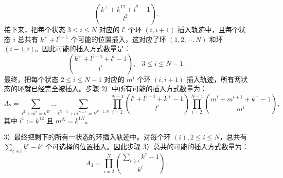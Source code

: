 \begin{equation*}
    \binom{k^++k^{12}+l^{2}-1}{l^{2}}.
\end{equation*}
接下来，把每个状态 $3 \leqslant i \leqslant N$ 对应的 $l^i$ 个环 $(i, i+1)$ 插入轨迹中，且每个状态 $i$ 总共有 $k^+ + l^{i-1}$ 个可能的位置插入，这对应了环 $(1, 2, \cdots, N)$ 和环 $(i-1, i)$。因此可能的插入方式数量是：
\begin{equation*}
    \binom{k^++l^{i-1}+l^{i}-1}{l^{i}},\;\;\;3\le i\le N-1.
\end{equation*}
最终，把每个状态 $2 \leqslant i \leqslant N-1$ 对应的 $m^i$ 个环 $(i, i+1)$ 插入轨迹，所有两状态的环就已经完全被插入。步骤 2）中所有可能的插入方式数量为：
\begin{equation*}
    A_2 = \sum_{l^{2}+m^{2}=k^{23}}\dots\sum_{l^{N-1}+m^{N-1}=k^{N-1,N}}
    \prod_{i=2}^{N-1}\binom{l^{i}+l^{i-1}+k^{+}-1}{l^{i}}\prod_{i=2}^{N-1}\binom{m^{i}+m^{i+1}+k^{-}-1}{m^{i}},
\end{equation*}
其中 $l^1 := k^{12}$ 且 $m^N = k^{1N}$。

3）最终把剩下的所有一状态的环插入轨迹中。对每个环 $(i), 2 \leqslant i \leqslant N$，总共有 $\sum_{c\ni i}k^c-k^i$ 个可选择的位置插入。因此步骤 3）总共的可能的插入方式数量为：
\begin{equation*}\label{formula:A3}
    A_3 = \prod_{i=2}^N\binom{\sum_{c\ni i}k^{c}-1}{k^{i}}.
\end{equation*}

